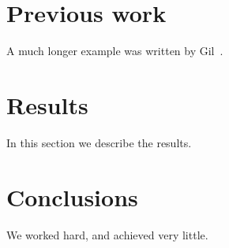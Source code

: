 \documentclass[12pt]{article}
\begin{document}
\section{Previous work}\label{previous work}
A much longer \LaTeXe{} example was written by Gil~\cite{Gil:02}.

\section{Results}\label{results}
In this section we describe the results.

\section{Conclusions}\label{conclusions}
We worked hard, and achieved very little.



\end{document}
